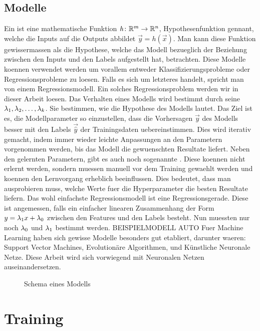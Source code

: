 \subsection{Modelle}
Ein  ist eine mathematische Funktion $\mathit{h}\colon \mathbb{R}^m
\to \mathbb{R}^n$, Hypothesenfunktion gennant, welche die Inputs auf die Outputs abbildet $\vec{y}=\mathit{h}(\vec{x})$.
Man kann diese Funktion gewissermassen als die Hypothese, welche das Modell bezueglich der Beziehung zwischen
den Inputs und den Labels aufgestellt hat, betrachten.
Diese Modelle koennen verwendet werden um vorallem entweder
Klassifizierungsprobleme oder Regressionsprobleme zu loesen. Falls es sich um
letzteres handelt, spricht man von einem Regressionsmodell. Ein solches
Regressionsproblem werden wir in dieser Arbeit loesen.
\para{}
Das Verhalten eines Modells wird bestimmt durch seine 
$\lambda_1, \lambda_2,\ldots,\lambda_k$. Sie bestimmen, wie die Hypothese des Modells lautet.
Das Ziel ist es, die Modellparameter so einzustellen, dass die Vorhersagen
$\vec{y}$ des Modells besser mit den Labels $\vec{\hat{y}}$ der Trainingsdaten uebereinstimmen.
Dies wird iterativ gemacht, indem immer wieder leichte Anpassungen an den
Parametern vorgenommen werden, bis das Modell die gewuenschten Resultate liefert.
\para{}
Neben den gelernten Parametern, gibt es auch noch sogenannte .
Diese koennen nicht erlernt werden, sondern muessen manuell vor dem Training gewaehlt werden und koennen den Lernvorgang erheblich beeinflussen.
Dies bedeutet, dass man ausprobieren muss, welche Werte fuer die Hyperparameter
die besten Resultate liefern.
\para{}
Das wohl einfachste Regressionsmodell ist eine Regressionsgerade. Diese ist
angemessen, falls ein einfacher linearen Zusammenhang der Form $y=\lambda_1x +
\lambda_0$ zwischen den Features und den Labels besteht.
Nun muessten nur noch $\lambda_0$ und $\lambda_1$ bestimmt werden.
BEISPIELMODELL AUTO
\para{}
Fuer Machine Learning haben sich gewisse Modelle besonders gut etabliert,
darunter waeren: Support Vector Machines, Evolutionäre Algorithmen, und Künstliche Neuronale Netze.
Diese Arbeit wird sich vorwiegend mit Neuronalen Netzen auseinandersetzen.
\\
\begin{figure}[h!]
  \centering


  \caption{Schema eines Modells}
\end{figure}

\section{Training}
